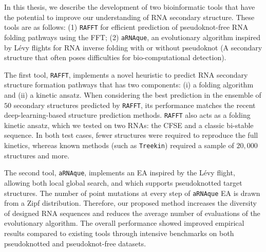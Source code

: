 

In this thesis, we describe the development of two bioinformatic tools that have the potential to improve our understanding of \ac{RNA} secondary structure. These tools are as follows: (1) \texttt{RAFFT} for efficient prediction of pseudoknot-free \ac{RNA} folding pathways using the \ac{FFT}; (2) \texttt{aRNAque}, an evolutionary algorithm inspired by Lévy flights for  \ac{RNA} inverse folding with or without pseudoknot (A secondary structure that often poses difficulties for bio-computational detection). 

The first tool, \texttt{RAFFT}, implements a novel heuristic to predict \ac{RNA} secondary structure formation pathways that has two components: (i) a folding algorithm and (ii) a kinetic ansatz. When considering the best prediction in the ensemble of $50$ secondary structures predicted by \texttt{RAFFT}, its performance matches the recent deep-learning-based structure prediction methods. \texttt{RAFFT} also acts as a folding kinetic ansatz, which we tested on two  \acp{RNA}: the \ac{CFSE} and a classic bi-stable sequence. In both test cases, fewer structures were required to reproduce the full kinetics, whereas known methods (such as \texttt{Treekin}) required a sample of $20,000$ structures and more. 

The second tool, \texttt{aRNAque}, implements an \ac{EA} inspired by the Lévy flight, allowing both local global search,  and which supports pseudoknotted target structures. The number of point mutations at every step of \texttt{aRNAque} \ac{EA} is drawn from a Zipf distribution. Therefore, our proposed method increases the diversity of designed \ac{RNA} sequences and reduces the average number of evaluations of the evolutionary algorithm. The overall performance showed improved empirical results compared to existing tools through intensive benchmarks on both pseudoknotted and pseudoknot-free datasets. 

